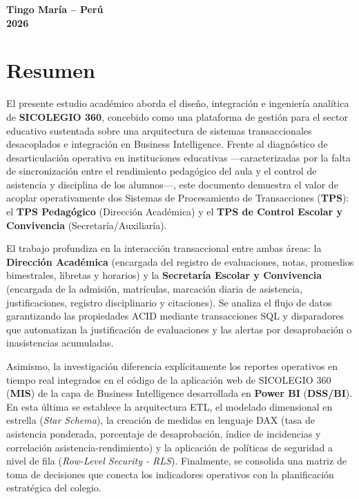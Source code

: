 \documentclass[12pt,a4paper,oneside]{report}
\begin{document}
\begin{titlepage}
\begin{center}
            \vfill
            
            {\fontsize{12}{14}\selectfont\textbf{Tingo María -- Perú}} \\[0.2cm]
            {\fontsize{12}{14}\selectfont\textbf{2026}}
        \end{center}
    \end{titlepage}

    \chapter*{Resumen}

    El presente estudio académico aborda el diseño, integración e ingeniería analítica de \textbf{SICOLEGIO 360}, concebido como una plataforma de gestión para el sector educativo sustentada sobre una arquitectura de sistemas transaccionales desacoplados e integración en Business Intelligence. Frente al diagnóstico de desarticulación operativa en instituciones educativas —caracterizadas por la falta de sincronización entre el rendimiento pedagógico del aula y el control de asistencia y disciplina de los alumnos—, este documento demuestra el valor de acoplar operativamente dos Sistemas de Procesamiento de Transacciones (\textbf{TPS}): el \textbf{TPS Pedagógico} (Dirección Académica) y el \textbf{TPS de Control Escolar y Convivencia} (Secretaría/Auxiliaría).

    El trabajo profundiza en la interacción transaccional entre ambas áreas: la \textbf{Dirección Académica} (encargada del registro de evaluaciones, notas, promedios bimestrales, libretas y horarios) y la \textbf{Secretaría Escolar y Convivencia} (encargada de la admisión, matrículas, marcación diaria de asistencia, justificaciones, registro disciplinario y citaciones). Se analiza el flujo de datos garantizando las propiedades ACID mediante transacciones SQL y disparadores que automatizan la justificación de evaluaciones y las alertas por desaprobación o inasistencias acumuladas.

    Asimismo, la investigación diferencia explícitamente los reportes operativos en tiempo real integrados en el código de la aplicación web de SICOLEGIO 360 (\textbf{MIS}) de la capa de Business Intelligence desarrollada en \textbf{Power BI} (\textbf{DSS/BI}). En esta última se establece la arquitectura ETL, el modelado dimensional en estrella (\textit{Star Schema}), la creación de medidas en lenguaje DAX (tasa de asistencia ponderada, porcentaje de desaprobación, índice de incidencias y correlación asistencia-rendimiento) y la aplicación de políticas de seguridad a nivel de fila (\textit{Row-Level Security - RLS}). Finalmente, se consolida una matriz de toma de decisiones que conecta los indicadores operativos con la planificación estratégica del colegio.
\end{document}
